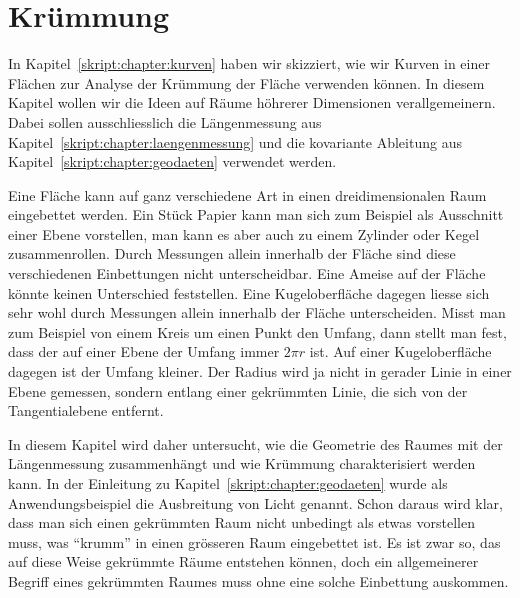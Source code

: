 %
%
%
\chapter{Krümmung%
\label{skript:chapter:kruemmung}}
\rhead{}

In Kapitel~\ref{skript:chapter:kurven} haben wir skizziert, wie wir
Kurven in einer Flächen zur Analyse der Krümmung der Fläche verwenden
können.
In diesem Kapitel wollen wir die Ideen auf Räume höhrerer Dimensionen
verallgemeinern.
Dabei sollen ausschliesslich die Längenmessung aus
Kapitel~\ref{skript:chapter:laengenmessung} und die kovariante Ableitung
aus Kapitel~\ref{skript:chapter:geodaeten} verwendet werden.

Eine Fläche kann auf ganz verschiedene Art in
einen dreidimensionalen Raum eingebettet werden.
Ein Stück Papier kann man sich zum Beispiel als Ausschnitt einer
Ebene vorstellen, man kann es aber auch zu einem Zylinder oder
Kegel zusammenrollen.
Durch Messungen allein innerhalb der Fläche sind diese verschiedenen
Einbettungen nicht unterscheidbar.
Eine Ameise auf der Fläche könnte keinen Unterschied feststellen.
Eine Kugeloberfläche dagegen liesse sich sehr wohl durch Messungen
allein innerhalb der Fläche unterscheiden.
Misst man zum Beispiel von einem Kreis um einen Punkt den Umfang,
dann stellt man fest, dass der auf einer Ebene der Umfang immer $2\pi r$ ist.
Auf einer Kugeloberfläche dagegen ist der Umfang kleiner.
Der Radius wird ja nicht in gerader Linie in einer Ebene gemessen,
sondern entlang einer gekrümmten Linie, die sich von der Tangentialebene
entfernt.

In diesem Kapitel wird daher untersucht, wie die Geometrie des Raumes
mit der Längenmessung zusammenhängt und wie Krümmung charakterisiert
werden kann.
In der Einleitung zu Kapitel~\ref{skript:chapter:geodaeten} wurde
als Anwendungsbeispiel die Ausbreitung von Licht genannt.
Schon daraus wird klar, dass man sich einen gekrümmten
Raum nicht unbedingt als etwas vorstellen muss, was ``krumm'' in einen
grösseren Raum eingebettet ist. 
Es ist zwar so, das auf diese Weise gekrümmte Räume entstehen können,
doch ein allgemeinerer Begriff eines gekrümmten Raumes muss ohne eine
solche Einbettung auskommen.




